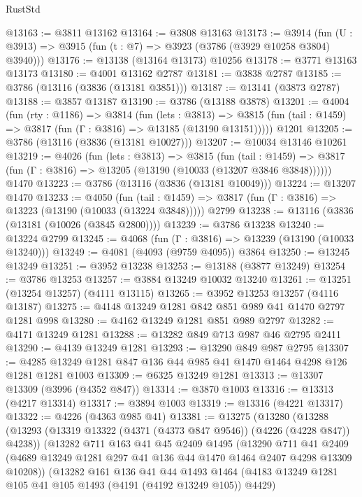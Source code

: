 \begin{lexlean}{RustStd}
\begin{coremodule}
@13163 := @3811 @13162
@13164 := @3808 @13163
@13173 := @3914
    (fun (U : @3913) => @3915 (fun (t : @7) => @3923 (@3786 (@3929 @10258 @3804) @3940)))
@13176 := @13138 (@13164 @13173) @10256
@13178 := @3771 @13163 @13173
@13180 := @4001 @13162 @2787
@13181 := @3838 @2787
@13185 := @3786 (@13116 (@3836 (@13181 @3851)))
@13187 := @13141 (@3873 @2787)
@13188 := @3857 @13187
@13190 := @3786 (@13188 @3878)
@13201 := @4004
    (fun (rty : @1186) =>
    @3814
      (fun (lets : @3813) =>
      @3815 (fun (tail : @1459) => @3817 (fun (Γ : @3816) => @13185 (@13190 @13151)))))
    @1201
@13205 := @3786 (@13116 (@3836 (@13181 @10027)))
@13207 := @10034 @13146 @10261
@13219 := @4026
    (fun (lets : @3813) =>
    @3815
      (fun (tail : @1459) =>
      @3817 (fun (Γ : @3816) => @13205 (@13190 (@10033 (@13207 @3846 @3848))))))
    @1470
@13223 := @3786 (@13116 (@3836 (@13181 @10049)))
@13224 := @13207 @1470
@13233 := @4050
    (fun (tail : @1459) => @3817 (fun (Γ : @3816) => @13223 (@13190 (@10033 (@13224 @3848)))))
    @2799
@13238 := @13116 (@3836 (@13181 (@10026 (@3845 @2800))))
@13239 := @3786 @13238
@13240 := @13224 @2799
@13245 := @4068 (fun (Γ : @3816) => @13239 (@13190 (@10033 @13240)))
@13249 := @4081 (@4093 (@9759 @4095)) @3864
@13250 := @13245 @13249
@13251 := @3952 @13238
@13253 := @13188 (@3877 @13249)
@13254 := @3786 @13253
@13257 := @3884 @13249 @10032 @13240
@13261 := @13251 (@13254 @13257) (@4111 @13115)
@13265 := @3952 @13253 @13257 (@4116 @13187)
@13275 := @4148 @13249 @1281 @842 @851 @989 @41 @1470 @2797 @1281 @998
@13280 := @4162 @13249 @1281 @851 @989 @2797
@13282 := @4171 @13249 @1281
@13288 := @13282 @849 @713 @987 @46 @2795 @2411
@13290 := @4139 @13249 @1281
@13293 := @13290 @849 @987 @2795
@13307 := @4285 @13249 @1281 @847 @136 @44 @985 @41 @1470 @1464 @4298 @126 @1281 @1281 @1003
@13309 := @6325 @13249 @1281
@13313 := @13307 @13309 (@3996 (@4352 @847))
@13314 := @3870 @1003
@13316 := @13313 (@4217 @13314)
@13317 := @3894 @1003
@13319 := @13316 (@4221 @13317)
@13322 := @4226 (@4363 @985 @41)
@13381 := @13275
    (@13280
      (@13288
        (@13293 (@13319 @13322 (@4371 (@4373 @847 @9546)) (@4226 (@4228 @847)) @4238))
        (@13282
          @711
          @163
          @41
          @45
          @2409
          @1495
          (@13290
            @711
            @41
            @2409
            (@4689 @13249 @1281 @297 @41 @136 @44 @1470 @1464 @2407 @4298 @13309 @10208))
          (@13282
            @161
            @136
            @41
            @44
            @1493
            @1464
            (@4183 @13249 @1281 @105 @41 @105 @1493 (@4191 (@4192 @13249 @105)) @4429)

\end{coremodule}
\end{lexlean}
